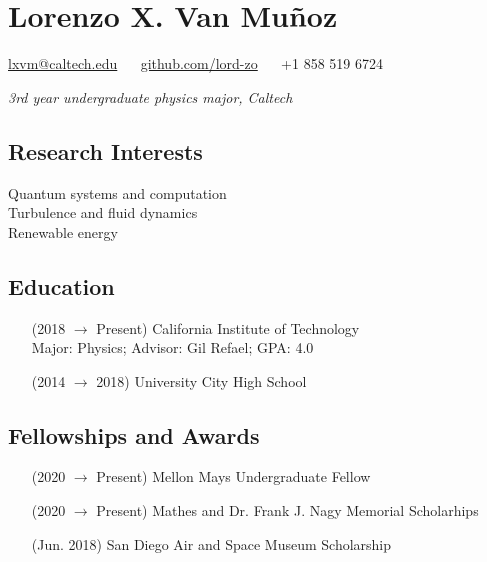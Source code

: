 \documentclass{article}
\begin{document}
{\centering

\section*{Lorenzo X. Van Muñoz}

\href{mailto:lxvm@caltech.edu}{lxvm@caltech.edu}
$\quad$
\href{https://github.com/lord-zo}{github.com/lord-zo}
$\quad$
+1 858 519 6724

\noindent \textit{3rd year undergraduate physics major, Caltech}

}


\begin{multicols}{2}

\subsection*{Research Interests}

\noindent Quantum systems and computation \\
\noindent Turbulence and fluid dynamics \\
\noindent Renewable energy


\subsection*{Education}

\begin{enumerate}
    \item [(2018 $\to$ Present)] California Institute of Technology \\
        Major: Physics; Advisor: Gil Refael; GPA: 4.0
    \item [(2014 $\to$ 2018)] University City High School
\end{enumerate}

\end{multicols}


\subsection*{Fellowships and Awards}

\begin{enumerate}
    \item [(2020 $\to$ Present)] Mellon Mays Undergraduate Fellow
    \item [(2020 $\to$ Present)] Mathes and Dr. Frank J. Nagy Memorial Scholarhips
    \item [(Jun. 2018)] San Diego Air and Space Museum Scholarship
\end{enumerate}
\end{document}
